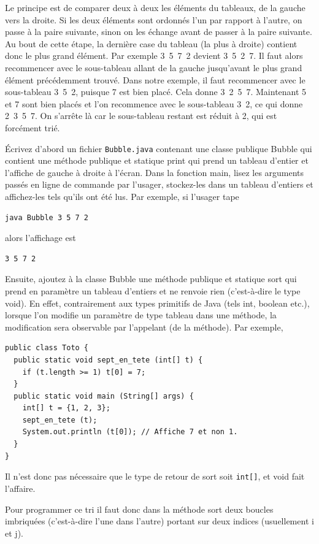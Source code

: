 \documentclass[11pt,a4paper]{article}
\begin{document}
Le principe est de comparer deux à deux les éléments du tableaux, de
la gauche vers la droite. Si les deux éléments sont ordonnés l'un par
rapport à l'autre, on passe à la paire suivante, sinon on les échange
avant de passer à la paire suivante. Au bout de cette étape, la
dernière case du tableau (la plus à droite) contient donc le plus
grand élément. Par exemple 3~5~7~2 devient 3~5~2~7. Il faut alors
recommencer avec le sous-tableau allant de la gauche jusqu'avant le
plus grand élément précédemment trouvé. Dans notre exemple, il faut
recommencer avec le sous-tableau 3~5~2, puisque 7 est bien placé. Cela
donne 3~2~5~7. Maintenant 5 et 7 sont bien placés et l'on recommence
avec le sous-tableau 3~2, ce qui donne 2~3~5~7. On s'arrête là car le
sous-tableau restant est réduit à 2, qui est forcément trié.

\medskip

Écrivez d'abord un fichier \texttt{Bubble.java} contenant une classe
publique \textsf{Bubble} qui contient une méthode publique et statique
\textsf{print} qui prend un tableau d'entier et l'affiche de gauche à
droite à l'écran. Dans la fonction \textsf{main}, lisez les arguments
passés en ligne de commande par l'usager, stockez-les dans un tableau
d'entiers et affichez-les tels qu'ils ont été lus. Par exemple, si
l'usager tape {\small
\begin{verbatim}
java Bubble 3 5 7 2
\end{verbatim}
}
\noindent alors l'affichage est
{\small
\begin{verbatim}
3 5 7 2
\end{verbatim}
}

\medskip

Ensuite, ajoutez à la classe \textsf{Bubble} une méthode publique et
statique \textsf{sort} qui prend en paramètre un tableau d'entiers et
ne renvoie rien (c'est-à-dire le type \textsf{void}). En effet,
contrairement aux types primitifs de \textsf{Java} (tels \textsf{int},
\textsf{boolean} etc.), lorsque l'on modifie un paramètre de type
tableau dans une méthode, la modification sera observable par
l'appelant (de la méthode). Par exemple,
{\small
\begin{verbatim}
public class Toto {
  public static void sept_en_tete (int[] t) {
    if (t.length >= 1) t[0] = 7;
  }
  public static void main (String[] args) {
    int[] t = {1, 2, 3};
    sept_en_tete (t);
    System.out.println (t[0]); // Affiche 7 et non 1.
  }
}
\end{verbatim}
}
Il n'est donc pas nécessaire que le type de retour de \textsf{sort}
soit \texttt{int[]}, et \textsf{void} fait l'affaire.

\medskip

Pour programmer ce tri il faut donc dans la méthode \textsf{sort} deux
boucles imbriquées (c'est-à-dire l'une dans l'autre) portant sur deux
indices (usuellement \textsf{i} et \textsf{j}).
\end{document}
